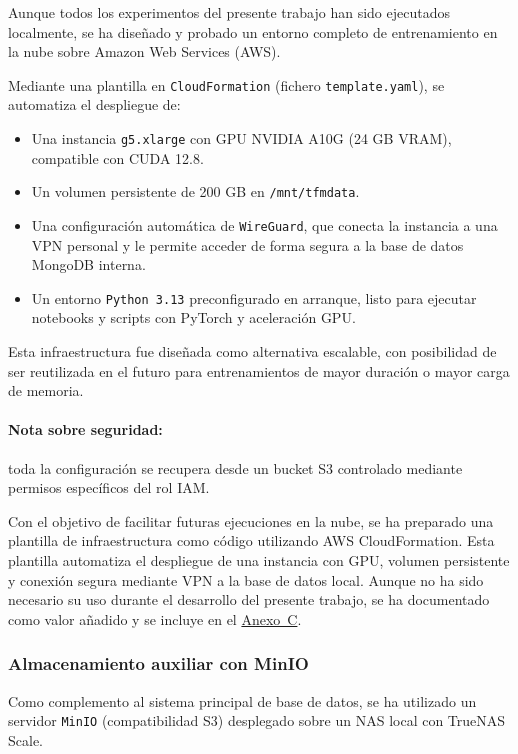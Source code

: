 Aunque todos los experimentos del presente trabajo han sido ejecutados localmente, se ha diseñado y probado un entorno completo de entrenamiento en la nube sobre Amazon Web Services (AWS).

Mediante una plantilla en \texttt{CloudFormation} (fichero \texttt{template.yaml}), se automatiza el despliegue de:

\begin{itemize}
	\item Una instancia \texttt{g5.xlarge} con GPU NVIDIA A10G (24 GB VRAM), compatible con CUDA 12.8.
	\item Un volumen persistente de 200 GB en \texttt{/mnt/tfmdata}.
	\item Una configuración automática de \texttt{WireGuard}, que conecta la instancia a una VPN personal y le permite acceder de forma segura a la base de datos MongoDB interna.
	\item Un entorno \texttt{Python 3.13} preconfigurado en arranque, listo para ejecutar notebooks y scripts con PyTorch y aceleración GPU.
\end{itemize}

Esta infraestructura fue diseñada como alternativa escalable, con posibilidad de ser reutilizada en el futuro para entrenamientos de mayor duración o mayor carga de memoria.

\paragraph{Nota sobre seguridad:} toda la configuración se recupera desde un bucket S3 controlado mediante permisos específicos del rol IAM.

Con el objetivo de facilitar futuras ejecuciones en la nube, se ha preparado una plantilla de infraestructura como código utilizando AWS CloudFormation. Esta plantilla automatiza el despliegue de una instancia con GPU, volumen persistente y conexión segura mediante VPN a la base de datos local. Aunque no ha sido necesario su uso durante el desarrollo del presente trabajo, se ha documentado como valor añadido y se incluye en el \hyperref[anexo:plantilla_aws]{Anexo~C}.

\subsubsection*{Almacenamiento auxiliar con MinIO}

Como complemento al sistema principal de base de datos, se ha utilizado un servidor \texttt{MinIO} (compatibilidad S3) desplegado sobre un NAS local con TrueNAS Scale.


